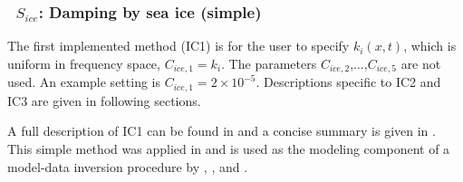 \vsssub
\subsubsection{~$S_{ice}$: Damping by sea ice (simple)} \label{sec:ICE1}
\vsssub


The first implemented method ({\code IC1}) is for the user to specify
${k_i(x,t)}$, which is uniform in frequency space, ${C_{ice,1}}={k_i}$. The
parameters ${C_{ice,2}}$,...,${C_{ice,5}}$ are not used. An example setting
is ${C_{ice,1}}=2\times 10^{-5}$. Descriptions specific to {\code IC2} and {\code IC3} are
given in following sections. 

A full description of {\code IC1} can be found in \cite{rep:RO13} and a concise summary is given in \cite{rep:RPLA18}. This simple method was applied in \cite{art:LKS15} and is used as the modeling component of a model-data inversion procedure by \cite{art:RTS16}, \cite{rep:RPLA18}, and \cite{rep:RMK18}.

